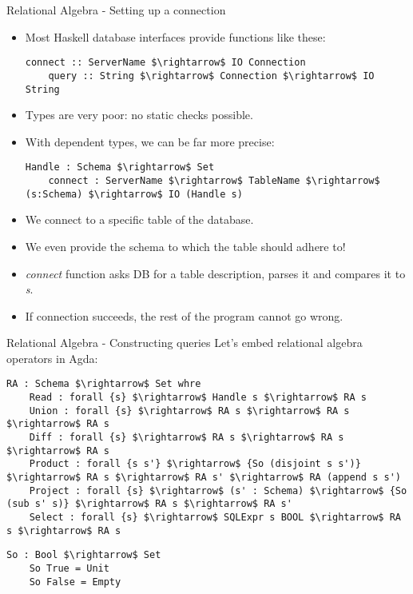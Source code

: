 \documentclass[10pt]{beamer}
\begin{document}
\begin{frame}[fragile]{Relational Algebra - Setting up a connection}

\begin{itemize}
\item Most Haskell database interfaces provide functions like these:
\begin{lstlisting}[mathescape=true]
	connect :: ServerName $\rightarrow$ IO Connection
	query :: String $\rightarrow$ Connection $\rightarrow$ IO String
\end{lstlisting}
\item Types are very poor: no static checks possible.
\item With dependent types, we can be far more precise:
\begin{lstlisting}[mathescape=true]
	Handle : Schema $\rightarrow$ Set
	connect : ServerName $\rightarrow$ TableName $\rightarrow$ (s:Schema) $\rightarrow$ IO (Handle s)
\end{lstlisting}
\item We connect to a specific table of the database.
\item We even provide the schema to which the table should adhere to!
\item \textit{connect} function asks DB for a table description, parses it and compares it to \textit{s}.
\item If connection succeeds, the rest of the program cannot go wrong.
\end{itemize}

\end{frame}

\begin{frame}[fragile]{Relational Algebra - Constructing queries}
Let's embed relational algebra operators in Agda:
\begin{lstlisting}[mathescape=true]
	RA : Schema $\rightarrow$ Set whre
	Read : forall {s} $\rightarrow$ Handle s $\rightarrow$ RA s
	Union : forall {s} $\rightarrow$ RA s $\rightarrow$ RA s $\rightarrow$ RA s
	Diff : forall {s} $\rightarrow$ RA s $\rightarrow$ RA s $\rightarrow$ RA s
	Product : forall {s s'} $\rightarrow$ {So (disjoint s s')} $\rightarrow$ RA s $\rightarrow$ RA s' $\rightarrow$ RA (append s s')
	Project : forall {s} $\rightarrow$ (s' : Schema) $\rightarrow$ {So (sub s' s)} $\rightarrow$ RA s $\rightarrow$ RA s'
	Select : forall {s} $\rightarrow$ SQLExpr s BOOL $\rightarrow$ RA s $\rightarrow$ RA s
\end{lstlisting}

\begin{lstlisting}[mathescape=true]
	So : Bool $\rightarrow$ Set
	So True = Unit
	So False = Empty
\end{lstlisting}

\end{frame}
\end{document}
